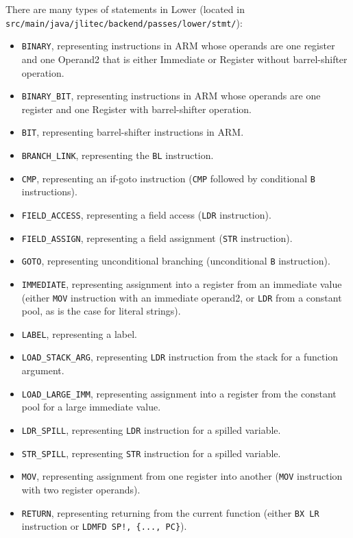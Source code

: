 \documentclass[nonacm, acmsmall, screen, 10pt]{acmart}
\begin{document}
There are many types of statements in Lower (located in \texttt{src/main/java/jlitec/\-backend/\-passes/\-lower/\-stmt/}):
\begin{itemize}
  \item \texttt{BINARY}, representing instructions in ARM whose operands are one register and one Operand2 that is either Immediate or Register without barrel-shifter operation.
  \item \texttt{BINARY\_BIT}, representing instructions in ARM whose operands are one register and one Register with barrel-shifter operation.
  \item \texttt{BIT}, representing barrel-shifter instructions in ARM.
  \item \texttt{BRANCH\_LINK}, representing the \texttt{BL} instruction.
  \item \texttt{CMP}, representing an if-goto instruction (\texttt{CMP} followed by conditional \texttt{B} instructions).
  \item \texttt{FIELD\_ACCESS}, representing a field access (\texttt{LDR} instruction).
  \item \texttt{FIELD\_ASSIGN}, representing a field assignment (\texttt{STR} instruction).
  \item \texttt{GOTO}, representing unconditional branching (unconditional \texttt{B} instruction).
  \item \texttt{IMMEDIATE}, representing assignment into a register from an immediate value (either \texttt{MOV} instruction with an immediate operand2, or \texttt{LDR} from a constant pool, as is the case for literal strings).
  \item \texttt{LABEL}, representing a label.
  \item \texttt{LOAD\_STACK\_ARG}, representing \texttt{LDR} instruction from the stack for a function argument.
  \item \texttt{LOAD\_LARGE\_IMM}, representing assignment into a register from the constant pool for a large immediate value.
  \item \texttt{LDR\_SPILL}, representing \texttt{LDR} instruction for a spilled variable.
  \item \texttt{STR\_SPILL}, representing \texttt{STR} instruction for a spilled variable.
  \item \texttt{MOV}, representing assignment from one register into another (\texttt{MOV} instruction with two register operands).
  \item \texttt{RETURN}, representing returning from the current function (either \texttt{BX LR} instruction or \texttt{LDMFD SP!, \{..., PC\}}).

\end{itemize}
\end{document}
